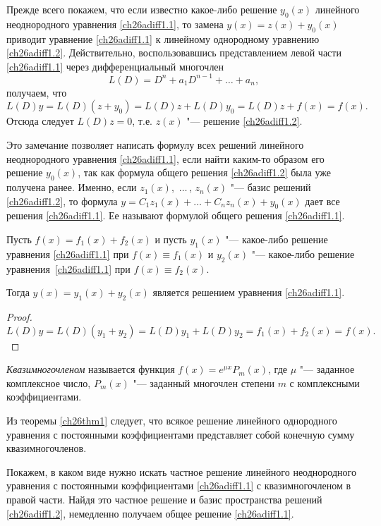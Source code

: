 Прежде всего покажем, что если известно какое-либо решение $y_0(x)$ линейного неоднородного уравнения \eqref{ch26adiff1.1}, то замена $y(x)=z(x)+y_0(x)$ приводит уравнение \eqref{ch26adiff1.1} к линейному однородному уравнению \eqref{ch26adiff1.2}. Действительно, воспользовавшись представлением левой части \eqref{ch26adiff1.1} через дифференциальный многочлен
\begin{equation}\label{ch26adiff1.3}
L(D)=D^n+a_1D^{n-1}+\dots+a_n,
\end{equation}
получаем, что
$$
L(D)y=L(D)(z+y_0)=L(D)z+L(D)y_0=L(D)z+f(x)=f(x).
$$
Отсюда следует $L(D)z=0$, т.е. $z(x)$ "--- решение \eqref{ch26adiff1.2}.

Это замечание позволяет написать формулу всех решений линейного неоднородного уравнения \eqref{ch26adiff1.1}, если найти каким-то образом его решение $y_0(x)$, так как формула общего решения \eqref{ch26adiff1.2} была уже получена ранее. Именно, если $z_1(x)$,~$\dots\,$, $z_n(x)$ "--- базис решений \eqref{ch26adiff1.2}, то формула $y=C_1z_1(x)+\dots+C_nz_n(x)+y_0(x)$ дает все решения \eqref{ch26adiff1.1}. Ее называют формулой общего решения \eqref{ch26adiff1.1}.

\begin{lemm}
Пусть $f(x)=f_1(x)+f_2(x)$ и пусть $y_1(x)$ "--- какое-либо решение уравнения \eqref{ch26adiff1.1} при $f(x)\equiv f_1(x)$ и $y_2(x)$ "--- какое-либо решение уравнения~\eqref{ch26adiff1.1} при $f(x) \equiv f_2(x)$.

Тогда $y(x)=y_1(x)+y_2(x)$ является решением уравнения \eqref{ch26adiff1.1}.
\end{lemm}

\begin{proof}
\begin{equation*}
L(D)y=L(D)(y_1+y_2)=L(D)y_1+L(D)y_2=f_1(x)+f_2(x)=f(x).\tag*{\qedhere}
\end{equation*}
\end{proof}

\begin{defn}
\textit{Квазимногочленом} называется функция $f(x)=e^{\mu x}P_m(x)$, где $\mu$ "--- заданное комплексное число, $P_m(x)$ "--- заданный многочлен степени $m$ с комплексными коэффициентами.
\end{defn}

Из теоремы \ref{ch26thm1} следует, что всякое решение линейного однородного уравнения с постоянными коэффициентами представляет собой конечную сумму квазимногочленов.

Покажем, в каком виде нужно искать частное решение линейного неоднородного уравнения с постоянными коэффициентами \eqref{ch26adiff1.1} с квазимногочленом в правой части. Найдя это частное решение и базис пространства решений \eqref{ch26adiff1.2}, немедленно получаем общее решение \eqref{ch26adiff1.1}.

